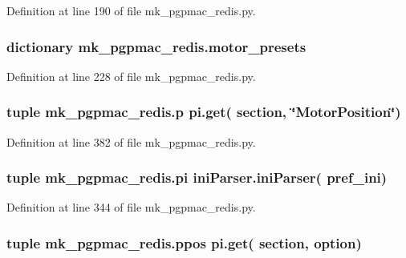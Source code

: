 Definition at line 190 of file mk\-\_\-pgpmac\-\_\-redis.\-py.

\hypertarget{namespacemk__pgpmac__redis_a2a04d8d0b7270384d1fac674c29e774a}{
\subsubsection[{motor\-\_\-presets}]{\setlength{\rightskip}{0pt plus 5cm}dictionary mk\-\_\-pgpmac\-\_\-redis.\-motor\-\_\-presets}}\label{namespacemk__pgpmac__redis_a2a04d8d0b7270384d1fac674c29e774a}


Definition at line 228 of file mk\-\_\-pgpmac\-\_\-redis.\-py.

\hypertarget{namespacemk__pgpmac__redis_a11daf2847f2dc94562b5b61b3f412574}{
\subsubsection[{p}]{\setlength{\rightskip}{0pt plus 5cm}tuple mk\-\_\-pgpmac\-\_\-redis.\-p pi.\-get( section, \char`\"{}Motor\-Position\char`\"{})}}\label{namespacemk__pgpmac__redis_a11daf2847f2dc94562b5b61b3f412574}


Definition at line 382 of file mk\-\_\-pgpmac\-\_\-redis.\-py.

\hypertarget{namespacemk__pgpmac__redis_a2f5bbda0250eecd94d166dc0a2fbff86}{
\subsubsection[{pi}]{\setlength{\rightskip}{0pt plus 5cm}tuple mk\-\_\-pgpmac\-\_\-redis.\-pi {\bf ini\-Parser.\-ini\-Parser}( {\bf pref\-\_\-ini})}}\label{namespacemk__pgpmac__redis_a2f5bbda0250eecd94d166dc0a2fbff86}


Definition at line 344 of file mk\-\_\-pgpmac\-\_\-redis.\-py.

\hypertarget{namespacemk__pgpmac__redis_aadd7321b8f7efe139c3e92e51cd34c00}{
\subsubsection[{ppos}]{\setlength{\rightskip}{0pt plus 5cm}tuple mk\-\_\-pgpmac\-\_\-redis.\-ppos pi.\-get( section, option)}}\label{namespacemk__pgpmac__redis_aadd7321b8f7efe139c3e92e51cd34c00}


